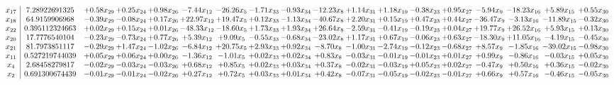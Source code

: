 \documentclass[9pt]{article}
\begin{document}
 \[\begin{array}{c| c c@{\hskip 2pt} c@{\hskip 2pt} c@{\hskip 2pt} c@{\hskip 2pt} c@{\hskip 2pt} c@{\hskip 2pt} c@{\hskip 2pt} c@{\hskip 2pt} c@{\hskip 2pt} c@{\hskip 2pt} c@{\hskip 2pt} c@{\hskip 2pt} c@{\hskip 2pt} c@{\hskip 2pt} c@{\hskip 2pt} c@{\hskip 2pt} }
 x_{17}   &  7.28922691325 & +  0.58 x_{29} & +  0.25 x_{24} & +  0.98 x_{26} & -7.44 x_{12} & -26.26 x_{5} & -1.71 x_{33} & -0.93 x_{34} & -12.23 x_{8} & +  1.14 x_{31} & +  1.18 x_{19} & -0.38 x_{23} & +  0.95 x_{27} & -5.94 x_{9} & -18.23 x_{16} & +  5.89 x_{15} & +  0.55 x_{30}\\
 x_{18}   &  64.9159906968 & -0.39 x_{29} & -0.08 x_{24} & +  0.17 x_{26} & + 22.97 x_{12} & + 19.47 x_{5} & +  0.12 x_{33} & -1.13 x_{34} & -40.67 x_{8} & +  2.20 x_{31} & +  0.15 x_{19} & +  0.47 x_{23} & +  0.44 x_{27} & -36.47 x_{9} & -3.13 x_{16} & -11.89 x_{15} & -0.32 x_{30}\\
 x_{22}   &  0.395112324663 & +  0.02 x_{29} & +  0.15 x_{24} & +  0.01 x_{26} & -48.33 x_{12} & -18.60 x_{5} & +  1.73 x_{33} & +  1.93 x_{34} & + 26.64 x_{8} & -2.59 x_{31} & -0.41 x_{19} & -0.19 x_{23} & +  0.04 x_{27} & + 19.77 x_{9} & + 26.52 x_{16} & +  5.93 x_{15} & +  0.13 x_{30}\\
 x_{20}   &  17.7776540104 & -0.23 x_{29} & -0.73 x_{24} & +  0.77 x_{26} & +  5.39 x_{12} & +  9.09 x_{5} & -0.55 x_{33} & -0.68 x_{34} & -23.02 x_{8} & +  1.17 x_{31} & +  0.67 x_{19} & -0.06 x_{23} & +  0.63 x_{27} & -18.30 x_{9} & + 11.05 x_{16} & -4.19 x_{15} & -0.45 x_{30}\\
 x_{21}   &  81.7973851117 & -0.29 x_{29} & +  1.47 x_{24} & -1.02 x_{26} & -6.84 x_{12} & + 20.75 x_{5} & +  2.93 x_{33} & +  0.92 x_{34} & -8.70 x_{8} & -1.00 x_{31} & -2.74 x_{19} & -0.12 x_{23} & -0.68 x_{27} & +  8.57 x_{9} & -1.85 x_{16} & -39.02 x_{15} & -0.98 x_{30}\\
 x_{11}   &  0.527219744039 & +  0.05 x_{29} & +  0.06 x_{24} & +  0.00 x_{26} & -1.36 x_{12} & -1.01 x_{5} & +  0.02 x_{33} & +  0.02 x_{34} & +  0.83 x_{8} & -0.03 x_{31} & -0.01 x_{19} & -0.01 x_{23} & +  0.01 x_{27} & +  0.99 x_{9} & -0.86 x_{16} & -0.03 x_{15} & +  0.05 x_{30}\\
 x_{4}   &  2.68458279817 & -0.02 x_{29} & -0.03 x_{24} & -0.03 x_{26} & +  0.68 x_{12} & +  0.85 x_{5} & +  0.02 x_{33} & +  0.03 x_{34} & +  0.37 x_{8} & -0.02 x_{31} & -0.03 x_{19} & +  0.05 x_{23} & +  0.02 x_{27} & -0.47 x_{9} & +  0.50 x_{16} & +  0.36 x_{15} & -0.02 x_{30}\\
 x_{2}   &  0.691300674439 & -0.01 x_{29} & -0.01 x_{24} & -0.02 x_{26} & +  0.27 x_{12} & +  0.72 x_{5} & +  0.03 x_{33} & +  0.01 x_{34} & +  0.42 x_{8} & -0.07 x_{31} & -0.05 x_{19} & -0.02 x_{23} & -0.01 x_{27} & +  0.66 x_{9} & +  0.57 x_{16} & -0.46 x_{15} & -0.05 x_{30}\\

\end{array}\]
\end{document}
